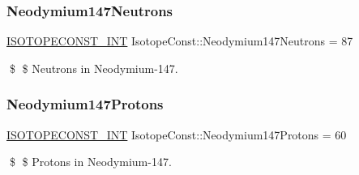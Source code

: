 \subsubsection{\texorpdfstring{Neodymium147\+Neutrons}{Neodymium147Neutrons}}
{\footnotesize\ttfamily \mbox{\hyperlink{group___isotope_const-_macros_ga5f18360b3e99483a35c32d789e62621c}{I\+S\+O\+T\+O\+P\+E\+C\+O\+N\+S\+T\+\_\+\+I\+NT}} Isotope\+Const\+::\+Neodymium147\+Neutrons = 87}

\$ \$ Neutrons in Neodymium-\/147. \mbox{\label{group___isotope_const-_neodymium-_nd147_ga043517e92fbd6bbcb468ee33210711a9}} 
\subsubsection{\texorpdfstring{Neodymium147\+Protons}{Neodymium147Protons}}
{\footnotesize\ttfamily \mbox{\hyperlink{group___isotope_const-_macros_ga5f18360b3e99483a35c32d789e62621c}{I\+S\+O\+T\+O\+P\+E\+C\+O\+N\+S\+T\+\_\+\+I\+NT}} Isotope\+Const\+::\+Neodymium147\+Protons = 60}

\$ \$ Protons in Neodymium-\/147. 